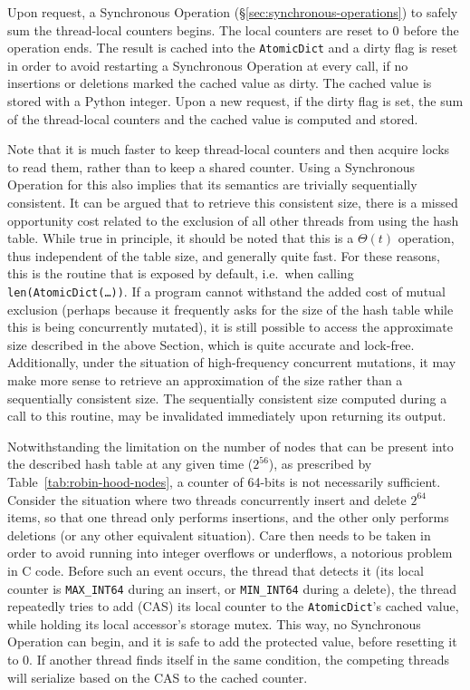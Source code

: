 Upon request, a Synchronous Operation (\S\ref{sec:synchronous-operations}) to safely sum the thread-local counters begins.
The local counters are reset to 0 before the operation ends.
The result is cached into the \texttt{AtomicDict} and a dirty flag is reset in order to avoid restarting a Synchronous Operation at every call, if no insertions or deletions marked the cached value as dirty.
The cached value is stored with a Python integer.
Upon a new request, if the dirty flag is set, the sum of the thread-local counters and the cached value is computed and stored.

Note that it is much faster to keep thread-local counters and then acquire locks to read them, rather than to keep a shared counter.
Using a Synchronous Operation for this also implies that its semantics are trivially sequentially consistent.
It can be argued that to retrieve this consistent size, there is a missed opportunity cost related to the exclusion of all other threads from using the hash table.
While true in principle, it should be noted that this is a $\Theta(t)$ operation, thus independent of the table size, and generally quite fast.
For these reasons, this is the routine that is exposed by default, i.e.\ when calling \texttt{{len(AtomicDict(\ldots))}}.
If a program cannot withstand the added cost of mutual exclusion (perhaps because it frequently asks for the size of the hash table while this is being concurrently mutated), it is still possible to access the approximate size described in the above Section, which is quite accurate and lock-free.
Additionally, under the situation of high-frequency concurrent mutations, it may make more sense to retrieve an approximation of the size rather than a sequentially consistent size.
The sequentially consistent size computed during a call to this routine, may be invalidated immediately upon returning its output.

Notwithstanding the limitation on the number of nodes that can be present into the described hash table at any given time ($2^{56}$), as prescribed by Table~\ref{tab:robin-hood-nodes}, a counter of 64-bits is not necessarily sufficient.
Consider the situation where two threads concurrently insert and delete $2^{64}$ items, so that one thread only performs insertions, and the other only performs deletions (or any other equivalent situation).
Care then needs to be taken in order to avoid running into integer overflows or underflows, a notorious problem in C code.
Before such an event occurs, the thread that detects it (its local counter is \texttt{MAX\_INT64} during an insert, or \texttt{MIN\_INT64} during a delete), the thread repeatedly tries to add (CAS) its local counter to the \texttt{AtomicDict}'s cached value, while holding its local accessor's storage mutex.
This way, no Synchronous Operation can begin, and it is safe to add the protected value, before resetting it to 0.
If another thread finds itself in the same condition, the competing threads will serialize based on the CAS to the cached counter.

